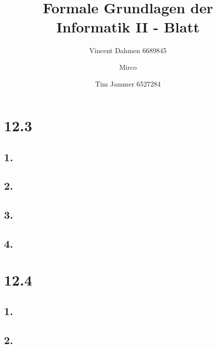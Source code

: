 \documentclass[12pt,a4paper]{article}
\title{Formale Grundlagen der Informatik II - Blatt \blattNr}
\author{Vincent Dahmen 6689845  \and Mirco \and Tim Jammer 6527284}
\def \blattNr{12}
\begin{document}
\maketitle{}

\section*{\blattNr .3}
\subsection*{1.}
%




\subsection*{2.}
%

\subsection*{3.}


\subsection*{4.}


%
%
%

\pagebreak

\section*{\blattNr .4}

\subsection*{1.}


%
\subsection*{2.}

 	
\end{document}

